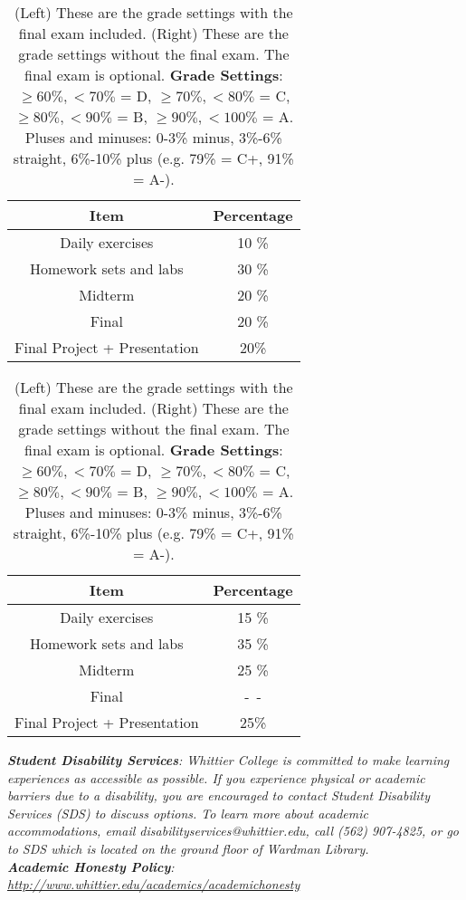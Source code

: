 \documentclass[10pt]{article}
\begin{document}
\begin{table}[h]
\centering
\begin{tabular}{| c | c |}
\hline
Item & Percentage \\ \hline \hline
Daily exercises & 10 \% \\ \hline
Homework sets and labs & 30 \% \\ \hline
Midterm & 20 \% \\ \hline
Final & 20 \% \\ \hline
Final Project + Presentation & 20\% \\ \hline
\end{tabular}
\begin{tabular}{| c | c |}
\hline
Item & Percentage \\ \hline \hline
Daily exercises & 15 \% \\ \hline
Homework sets and labs & 35 \% \\ \hline
Midterm & 25 \% \\ \hline
Final & -~- \\ \hline
Final Project + Presentation & 25\% \\ \hline
\end{tabular}
\caption{\label{tab:grades} (Left) These are the grade settings with the final exam included. (Right) These are the grade settings without the final exam.  The final exam is optional. \textbf{Grade Settings}: $\geq 60\%, <70\%$ = D, $\geq 70\%, <80\%$ = C, $\geq 80\%, <90\%$ = B, $\geq 90\%, <100\%$ = A. Pluses and minuses: 0-3\% minus, 3\%-6\% straight, 6\%-10\% plus (e.g. 79\% = C+, 91\% = A-).}
\end{table}
\noindent
\textit{\textbf{Student Disability Services}: Whittier College is committed to make learning experiences as accessible as possible. If you experience physical or academic barriers due to a disability, you are encouraged to contact Student Disability Services (SDS) to discuss options. To learn more about academic accommodations, email disabilityservices@whittier.edu, call (562) 907-4825, or go to SDS which is located on the ground floor of Wardman Library.} \\
\textit{\textbf{Academic Honesty Policy}: \url{http://www.whittier.edu/academics/academichonesty}} \\

\clearpage
\end{document}
